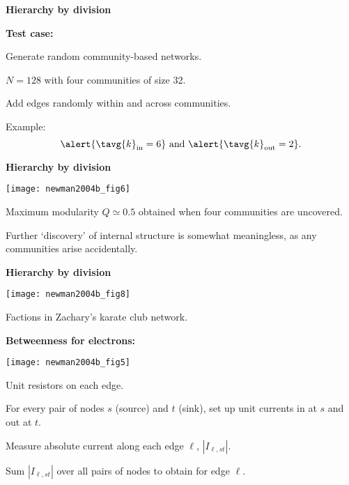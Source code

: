   




  \textbf{Hierarchy by division}

  \textbf{Test case:}
    
    
      Generate random community-based networks.
    
      $N=128$ with four communities of size 32.
    
      Add edges randomly within and across communities.
    
      Example:
      $$ 
      \alert{ \tavg{k}_{\textnormal{in}} = 6}
      \
      \mbox{and}
      \
      \alert{ \tavg{k}_{\textnormal{out}} = 2}.
      $$
    
  


  \textbf{Hierarchy by division}

  \texttt{[image: newman2004b\_fig6]}

  
  
    Maximum modularity $Q \simeq 0.5$ obtained
    when four communities are uncovered.
  
    Further `discovery' of internal structure
    is somewhat meaningless, as any communities
    arise accidentally.
  



  \textbf{Hierarchy by division}

  \texttt{[image: newman2004b\_fig8]}

  
   Factions in Zachary's karate club network.\cite{zachary1977a}
  


  \textbf{Betweenness for electrons:}

          
      \texttt{[image: newman2004b\_fig5]}
      
      
      
        Unit resistors on each edge.
      
        For every pair of nodes $s$ (source) and $t$ (sink),
        set up \alert{unit currents} in at $s$ and out at $t$.
      
        Measure absolute current along each edge $\ell$, $|I_{\ell,st}|$.
      
        
      
        Sum $|I_{\ell,st}|$ over all pairs of nodes
        to obtain  
        for edge $\ell$.
      
